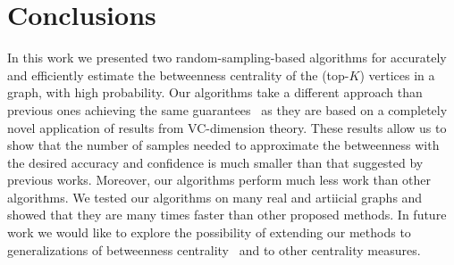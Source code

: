 \section{Conclusions}\label{sec:concl}
In this work we presented two random-sampling-based algorithms for accurately and
efficiently estimate the betweenness centrality of the (top-$K$) vertices in a
graph, with high probability.
Our algorithms take a different approach than previous ones achieving the same
guarantees~\citep{BrandesP07,GeisbergerSS08,JacobKLPT05} as they are based on a
completely novel application of results from VC-dimension theory. These results
allow us to show that the number of samples needed to approximate the
betweenness with the desired accuracy and confidence is much smaller than that
suggested by previous works. Moreover, our algorithms perform much less work
than other algorithms. We tested our algorithms on many real and artiicial
graphs and showed that they are many times faster than other proposed methods.
In future work we would like to explore the possibility of extending our methods
to generalizations of betweenness centrality~\citep{KourtellisASIT12,DolevEP10}
and to other centrality measures.

